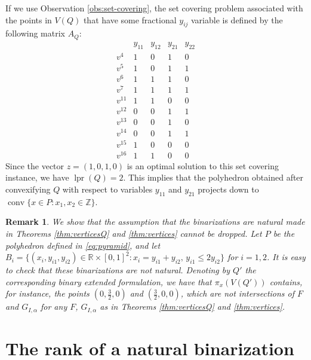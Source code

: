 \documentclass[11pt,a4paper]{article}
\newtheorem{remark}[theorem]{Remark}
\newcommand{\R}{\mathbb{R}}
\newcommand{\conv}{\operatorname{conv}}
\newcommand{\Z}{\mathbb{Z}}
\newcommand{\1}{\textbf{1}}
\newcommand{\lpr}{\operatorname{lpr}}
\begin{document}
If we use Observation \ref{obs:set-covering}, the set covering problem associated with the points in $V(Q)$ that have some fractional $y_{ij}$ variable is defined by the following matrix $A_Q$:
\[\begin{array}{c|cccc}
&y_{11}&y_{12}&y_{21}&y_{22}\\
\hline
v^4&1 &  0 &1 &  0 \\
v^5&1 & 0 &1 &1 \\
v^6&1 &1 &1 &  0 \\
v^7&1 &1 &1 &1 \\
v^{11}&1 &1 &  0 &  0 \\
v^{12}& 0 &  0 &1& 1 \\
v^{13}&  0 &  0& 1 &  0 \\
v^{14}& 0  & 0 &1& 1 \\
v^{15}& 1 &  0 &  0 &  0 \\
v^{16}& 1& 1 &  0 &  0
\end{array}\]
Since the vector $z=(1,0,1,0)$ is an optimal solution to this set covering instance, we have $\lpr(Q)=2$.
This implies that the polyhedron obtained after convexifying $Q$ with respect to variables $y_{11}$ and $y_{21}$ projects down to $\conv\{x\in P: x_1,x_2\in\Z\}$. 


\begin{remark}\label{rem:nonnatural}
We show that the assumption that the binarizations are natural made in Theorems \ref{thm:verticesQ} and \ref{thm:vertices} cannot be dropped.
Let $P$ be the polyhedron defined in \eqref{eq:pyramid}, and let $B_i=\{(x_i,y_{i1},y_{i2})\in \R\times [0,1]^2: x_i=y_{i1}+y_{i2},\, y_{i1}\le2y_{i2}\}$ for $i=1,2$. It is easy to check that these binarizations are not natural. Denoting by $Q'$ the corresponding binary extended formulation, we have that $\pi_x(V(Q'))$ contains, for instance, the points $(0,\frac{3}{2},0)$ and $(\frac{3}{2},0,0)$, which are not intersections of $F$ and $G_{I,\alpha}$ for any $F$, $G_{I,\alpha}$ as in Theorems \ref{thm:verticesQ} and \ref{thm:vertices}.
\end{remark}


\section{The rank of a natural binarization}\label{sec:rank}
\end{document}
